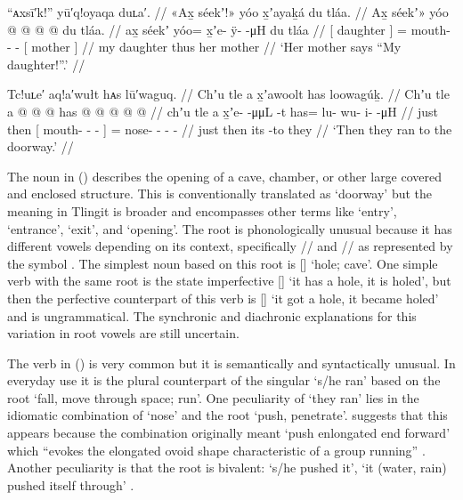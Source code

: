 \ex\label{ex:89-187-my-daughter-she-says-her-mother}%
%
\begingl
	\glpreamble	“ᴀxsī′k!” yū′q!oyaqa duʟa′. //
	\glpreamble	«\!Ax̱ séekʼ!\!» yóo x̱ʼayaḵá du tláa. //
	\gla	{} Ax̱ séekʼ\!» yóo @  @ {} @ {} @ {}
		{} du tláa. {} //
	\glb	{} ax̱ séekʼ {} yóo= x̱ʼe- ÿ-  -μH
		{} du tláa {} //
	\glc	{}[  daughter {}] = mouth- -  -
		{}[  mother {}] //
	\gld	{} my daughter {} thus  {} {} {}
		{} her mother {} //
	\glft	‘Her mother says “My daughter!”.’
		//
\endgl
\xe

\ex\label{ex:89-188-ran-to-doorway}%
%
\begingl
	\glpreamble	Tc!uʟe′ aq!a′wułt hᴀs lū′waguq. //
	\glpreamble	Chʼu tle a x̱ʼawoolt has loowagúḵ. //
	\gla	Chʼu tle {} a  @ {} @ {} @ {} {}
		has @  @ {} @ {} @ {} @ {} //
	\glb	chʼu tle {} a x̱ʼe-  -μμL -t {}
		has= lu- wu- i-  -μH //
	\glc	just then {}[  mouth-  - - {}]
		= nose- - -  - //
	\gld	just then {} its  {} {} -to {}
		they  {} {} {} {} //
	\glft	‘Then they ran to the doorway.’
		//
\endgl
\xe

The noun  in (\lastx) describes the opening of a cave, chamber, or other large covered and enclosed structure.
This is conventionally translated as ‘doorway’ but the meaning in Tlingit is broader and encompasses other terms like ‘entry’, ‘entrance’, ‘exit’, and ‘opening’.
The root  is phonologically unusual because it has different vowels depending on its context, specifically  // and  // as represented by the symbol .
The simplest noun based on this root is  [] ‘hole; cave’.
One simple verb with the same root is the state imperfective  [] ‘it has a hole, it is holed’, but then the perfective counterpart of this verb is  [] ‘it got a hole, it became holed’ and  is ungrammatical.
The synchronic and diachronic explanations for this variation in root vowels are still uncertain.

The verb  in (\lastx) is very common but it is semantically and syntactically unusual.
In everyday use it is the plural counterpart of the singular  ‘s/he ran’ based on the root  ‘fall, move through space; run’.
One peculiarity of  ‘they ran’ lies in the idiomatic combination of  ‘nose’ and the root  ‘push, penetrate’.
\citeauthor{leer:1991} suggests that this appears because the combination originally meant ‘push enlongated end forward’ which “evokes the elongated ovoid shape characteristic of a group running” \parencite[51]{leer:1991}.
Another peculiarity is that the root  is bivalent:  ‘s/he pushed it’,  ‘it (water, rain) pushed itself through’ \parencite[675]{leer:1976}.

